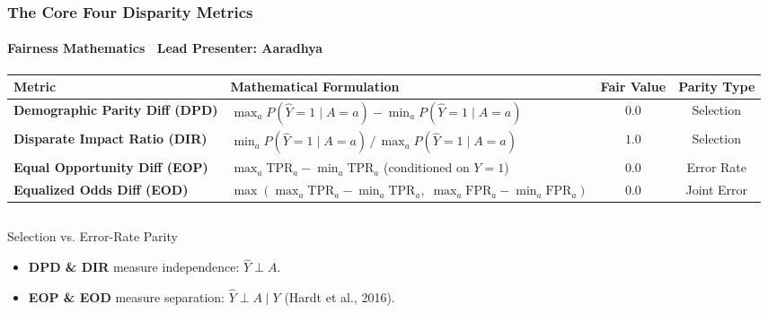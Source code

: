 \begin{frame}
  \frametitle{The Core Four Disparity Metrics}
  \framesubtitle{Fairness Mathematics \textbar\ Lead Presenter: Aaradhya}

  \begin{center}
    \fontsize{7pt}{8.5pt}\selectfont
    \renewcommand{\arraystretch}{1.15}
    \begin{tabular}{p{3.4cm}p{6.6cm}cc}
      \toprule
      \textbf{Metric} & \textbf{Mathematical Formulation} & \textbf{Fair Value} & \textbf{Parity Type} \\
      \midrule
      \textbf{Demographic Parity Diff (DPD)} & 
      $\max_a P(\hat{Y}=1 \mid A=a) - \min_a P(\hat{Y}=1 \mid A=a)$ & 
      $0.0$ & Selection \\
      
      \textbf{Disparate Impact Ratio (DIR)} & 
      $\min_a P(\hat{Y}=1 \mid A=a) \,/\, \max_a P(\hat{Y}=1 \mid A=a)$ & 
      $1.0$ & Selection \\
      
      \textbf{Equal Opportunity Diff (EOP)} & 
      $\max_a \text{TPR}_a - \min_a \text{TPR}_a$ \quad (conditioned on $Y=1$) & 
      $0.0$ & Error Rate \\
      
      \textbf{Equalized Odds Diff (EOD)} & 
      $\max\left(\max_a \text{TPR}_a - \min_a \text{TPR}_a, \; \max_a \text{FPR}_a - \min_a \text{FPR}_a\right)$ & 
      $0.0$ & Joint Error \\
      \bottomrule
    \end{tabular}
  \end{center}

  \vspace{0.1cm}
  \begin{columns}[T]
    \begin{column}{0.48\textwidth}
      \begin{card}{Selection vs. Error-Rate Parity}
        \scriptsize
        \begin{itemize}
          \item \textbf{DPD \& DIR} measure independence: $\hat{Y} \perp A$.
          \item \textbf{EOP \& EOD} measure separation: $\hat{Y} \perp A \mid Y$ (Hardt et al., 2016).
        \end{itemize}
      \end{card}
    \end{column}


\end{columns}
\end{frame}

